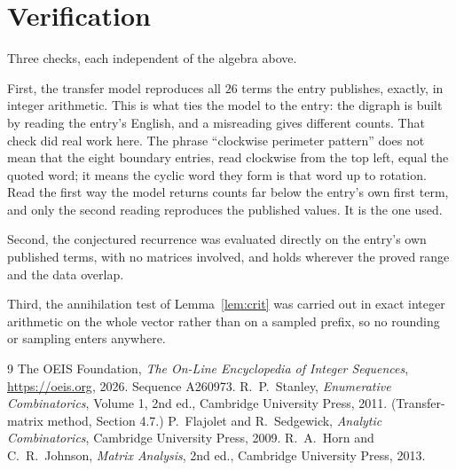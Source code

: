 \documentclass[11pt,a4paper]{article}
\theoremstyle{plain}
\theoremstyle{definition}
\begin{document}
\section{Verification}

Three checks, each independent of the algebra above.

First, the transfer model reproduces all $26$ terms the entry publishes, exactly, in
integer arithmetic. This is what ties the model to the entry: the digraph is built by reading
the entry's English, and a misreading gives different counts. That check did real work here. The phrase ``clockwise perimeter pattern'' does not mean that the eight boundary entries, read clockwise from the top left, equal the quoted word; it means the cyclic word they form is that word up to rotation. Read the first way the model returns counts far below the entry's own first term, and only the second reading reproduces the published values. It is the one used.

Second, the conjectured recurrence was evaluated directly on the entry's own published terms,
with no matrices involved, and holds wherever the proved range and the data overlap.

Third, the annihilation test of Lemma~\ref{lem:crit} was carried out in exact integer
arithmetic on the whole vector rather than on a sampled prefix, so no rounding or sampling
enters anywhere.

\begin{thebibliography}{9}
 The OEIS Foundation, \emph{The On-Line Encyclopedia of Integer
Sequences}, \url{https://oeis.org}, 2026. Sequence A260973.
 R.~P.~Stanley, \emph{Enumerative Combinatorics}, Volume 1, 2nd ed.,
Cambridge University Press, 2011. (Transfer-matrix method, Section 4.7.)
 P.~Flajolet and R.~Sedgewick, \emph{Analytic Combinatorics}, Cambridge
University Press, 2009.
 R.~A.~Horn and C.~R.~Johnson, \emph{Matrix Analysis}, 2nd ed., Cambridge
University Press, 2013.
\end{thebibliography}
\end{document}
